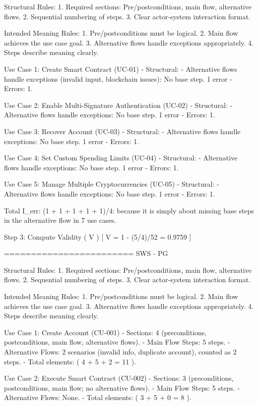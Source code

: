Structural Rules:
1. Required sections: Pre/postconditions, main flow, alternative flows.
2. Sequential numbering of steps.
3. Clear actor-system interaction format.

Intended Meaning Rules:
1. Pre/postconditions must be logical.
2. Main flow achieves the use case goal.
3. Alternative flows handle exceptions appropriately.
4. Steps describe meaning clearly.

Use Case 1: Create Smart Contract (UC-01)
- Structural:
- Alternative flows handle exceptions (invalid input, blockchain issues): No base step. 1 error
- Errors: 1.

Use Case 2: Enable Multi-Signature Authentication (UC-02)
- Structural:
- Alternative flows handle exceptions: No base step. 1 error
- Errors: 1.

Use Case 3: Recover Account (UC-03)
- Structural:
- Alternative flows handle exceptions: No base step. 1 error
- Errors: 1.

Use Case 4: Set Custom Spending Limits (UC-04)
- Structural:
- Alternative flows handle exceptions: No base step. 1 error
- Errors: 1.

Use Case 5: Manage Multiple Cryptocurrencies (UC-05)
- Structural:
- Alternative flows handle exceptions: No base step. 1 error
- Errors: 1.

Total I_err: (1 + 1 + 1 + 1 + 1)/4: because it is simply about missing base steps in the alternative flow in 7 use cases.

Step 3: Compute Validity ( V )
[
V = 1 - (5/4)/52 = 0.9759
]

========================
SWS - PG

Structural Rules:
1. Required sections: Pre/postconditions, main flow, alternative flows.
2. Sequential numbering of steps.
3. Clear actor-system interaction format.

Intended Meaning Rules:
1. Pre/postconditions must be logical.
2. Main flow achieves the use case goal.
3. Alternative flows handle exceptions appropriately.
4. Steps describe meaning clearly.

Use Case 1: Create Account (CU-001)
- Sections: 4 (preconditions, postconditions, main flow, alternative flows).
- Main Flow Steps: 5 steps.
- Alternative Flows: 2 scenarios (invalid info, duplicate account), counted as 2 steps.
- Total elements: ( 4 + 5 + 2 = 11 ).

Use Case 2: Execute Smart Contract (CU-002)
- Sections: 3 (preconditions, postconditions, main flow; no alternative flows).
- Main Flow Steps: 5 steps.
- Alternative Flows: None.
- Total elements: ( 3 + 5 + 0 = 8 ).

